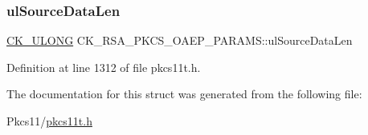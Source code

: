 \subsubsection{\texorpdfstring{ul\+Source\+Data\+Len}{ulSourceDataLen}}
{\footnotesize\ttfamily \hyperlink{pkcs11t_8h_a35181858a3b7a0a81f49d180d8f446ef}{C\+K\+\_\+\+U\+L\+O\+NG} C\+K\+\_\+\+R\+S\+A\+\_\+\+P\+K\+C\+S\+\_\+\+O\+A\+E\+P\+\_\+\+P\+A\+R\+A\+M\+S\+::ul\+Source\+Data\+Len}



Definition at line 1312 of file pkcs11t.\+h.



The documentation for this struct was generated from the following file\+:\begin{DoxyCompactItemize}
\item 
Pkcs11/\hyperlink{pkcs11t_8h}{pkcs11t.\+h}\end{DoxyCompactItemize}
